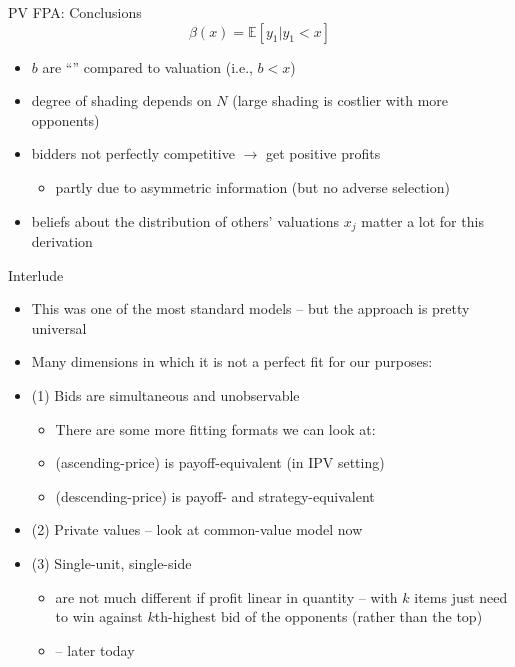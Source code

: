 \documentclass[english,10pt
,aspectratio=169
]{beamer}
\begin{document}
\begin{frame}{PV FPA: Conclusions}
	\[ \beta(x) = \mathbb{E}[y_1 | y_1<x] \]
	\begin{itemize}
		\item {} $b$ are ``'' compared to valuation (i.e., $b < x$)
		\item degree of shading depends on $N$ (large shading is costlier with more opponents)
		\item bidders not perfectly competitive $\rightarrow$ get positive profits
		\begin{itemize}
			\item partly due to asymmetric information (but no adverse selection)
		\end{itemize}
		\item beliefs about the distribution of others' valuations $x_j$ matter a lot for this derivation
	\end{itemize}
\end{frame}


\begin{frame}{Interlude}
	\begin{itemize}
		\item This was one of the most standard models -- but the approach is pretty universal
		\item Many dimensions in which it is not a perfect fit for our purposes:
		\item (1) \alert{Bids are simultaneous and unobservable}
		\begin{itemize}
			\item There are some more fitting formats we can look at:
			\item {} (ascending-price) is payoff-equivalent (in IPV setting)
			\item {} (descending-price) is payoff- and strategy-equivalent
		\end{itemize}
		\item (2) \alert{Private values} -- look at common-value model now
		\item (3) \alert{Single-unit, single-side} 
		\begin{itemize}
			\item {} are not much different if profit linear in quantity -- with $k$ items just need to win against $k$th-highest bid of the opponents (rather than the top)
			\item {} -- later today
		\end{itemize}
	\end{itemize}
\end{frame}
\end{document}
